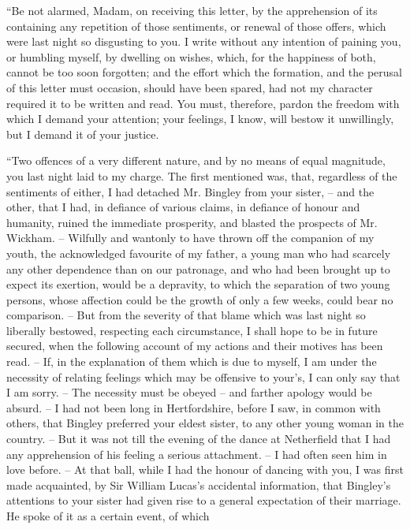 \begin{letter}
“Be not alarmed, Madam, on receiving this letter, by
the apprehension of its containing any repetition of those
sentiments, or renewal of those offers, which were last
night so disgusting to you. I write without any intention
of paining you, or humbling myself, by dwelling on
wishes, which, for the happiness of both, cannot be too
soon forgotten; and the effort which the formation, and
the perusal of this letter must occasion, should have been
spared, had not my character required it to be written
and read. You must, therefore, pardon the freedom with
which I demand your attention; your feelings, I know,
will bestow it unwillingly, but I demand it of your justice.

“Two offences of a very different nature, and by no
means of equal magnitude, you last night laid to my
charge. The first mentioned was, that, regardless of the
sentiments of either, I had detached Mr. Bingley from
your sister, -- and the other, that I had, in defiance of
various claims, in defiance of honour and humanity, ruined
the immediate prosperity, and blasted the prospects of
Mr. Wickham. -- Wilfully and wantonly to have thrown off
the companion of my youth, the acknowledged favourite
of my father, a young man who had scarcely any other
dependence than on our patronage, and who had been
brought up to expect its exertion, would be a depravity,
to which the separation of two young persons, whose
affection could be the growth of only a few weeks, could
bear no comparison. -- But from the severity of that blame
which was last night so liberally bestowed, respecting each
circumstance, I shall hope to be in future secured, when
the following account of my actions and their motives
has been read. -- If, in the explanation of them which is
due to myself, I am under the necessity of relating feelings
which may be offensive to your’s, I can only say that I am
sorry. -- The necessity must be obeyed -- and farther apology
would be absurd. -- I had not been long in Hertfordshire,
before I saw, in common with others, that Bingley preferred
your eldest sister, to any other young woman in the
country. -- But it was not till the evening of the dance at
Netherfield that I had any apprehension of his feeling
a serious attachment. -- I had often seen him in love before.
-- At that ball, while I had the honour of dancing with
you, I was first made acquainted, by Sir William Lucas’s
accidental information, that Bingley’s attentions to your
sister had given rise to a general expectation of their
marriage. He spoke of it as a certain event, of which

\end{letter}
